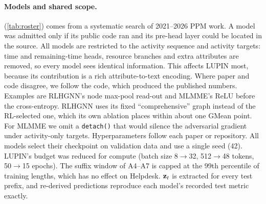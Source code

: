 \paragraph{Models and shared scope.}
\famA (\cref{tab:roster}) comes from a systematic search of 2021--2026 PPM
work. A model was admitted only if its public code ran and its pre-head layer
could be located in the source. All models are restricted to the activity
sequence and activity targets: time and remaining-time heads, resource
branches and extra attributes are removed, so every model sees identical
information. This affects LUPIN most, because its contribution is a rich
attribute-to-text encoding. Where paper and code disagree, we follow the code,
which produced the published numbers. Examples are RLHGNN's node max-pool
read-out and MLMME's ReLU before the cross-entropy. RLHGNN uses its fixed
``comprehensive'' graph instead of the RL-selected one, which its own ablation
places within about one GMean point. For MLMME we omit a \texttt{detach()}
that would silence the adversarial gradient under activity-only targets.
Hyperparameters follow each paper or repository. All models select their
checkpoint on validation data and use a single seed (42). LUPIN's budget was
reduced for compute (batch size 8$\to$32, 512$\to$48 tokens, 50$\to$15
epochs). The suffix window of A4--A7 is capped at the 99th percentile of
training lengths, which has no effect on Helpdesk. $\mathbf{z}_t$ is extracted for
every test prefix, and re-derived predictions reproduce each model's
recorded test metric exactly.

